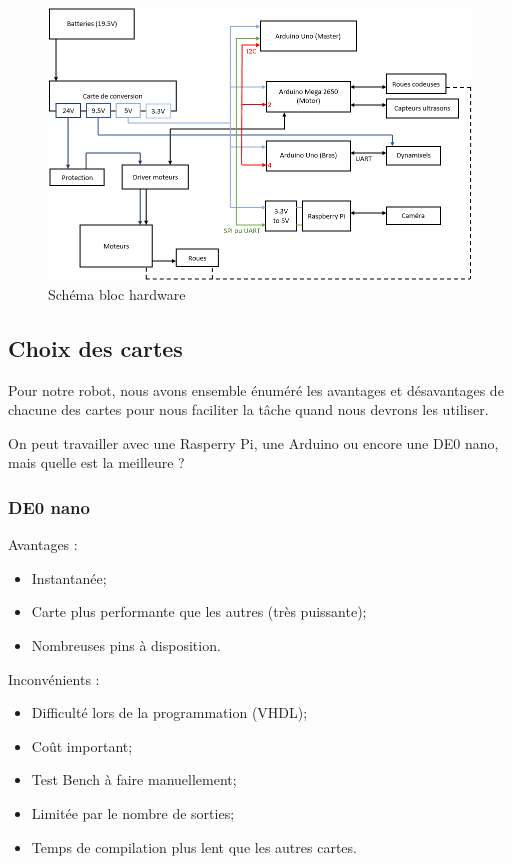 \begin{figure}[!ht]
	\centering
	\includegraphics[width=15cm]{hardware.PNG}
	\caption{Schéma bloc hardware}
	\label{img:hardware}
\end{figure}

\subsection{Choix des cartes}
Pour notre robot, nous avons ensemble énuméré les avantages et désavantages de chacune des cartes pour nous faciliter la tâche quand nous devrons les utiliser.

\noindent On peut travailler avec une Rasperry Pi, une Arduino ou encore une DE0 nano, mais quelle est la meilleure ? 

\subsubsection{DE0 nano}
\noindent Avantages :
\begin{itemize}
	\item Instantanée;
	\item Carte plus performante que les autres (très puissante);
	\item Nombreuses pins à disposition.
\end{itemize}

\noindent Inconvénients :
\begin{itemize}
	\item Difficulté lors de la programmation (VHDL);
	\item Coût important;
	\item Test Bench à faire manuellement;
	\item Limitée par le nombre de sorties;
	\item Temps de compilation plus lent que les autres cartes.
\end{itemize}

